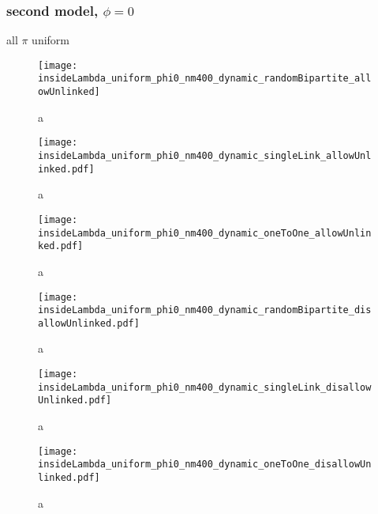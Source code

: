 \subsubsection{second model, $\phi=0$}

all $\pi$ uniform

\begin{figure}
  \centering
  \texttt{[image: insideLambda\_uniform\_phi0\_nm400\_dynamic\_randomBipartite\_allowUnlinked]}
  \caption{a}
  \label{fig:insideLambda_uniform_phi0_nm400_dynamic_randomBipartite_allowUnlinked}
\end{figure}

\begin{figure}
  \centering
  \texttt{[image: insideLambda\_uniform\_phi0\_nm400\_dynamic\_singleLink\_allowUnlinked.pdf]}
  \caption{a}
  \label{fig:insideLambda_uniform_phi0_nm400_dynamic_singleLink_allowUnlinked}
\end{figure}

\begin{figure}
  \centering
  \texttt{[image: insideLambda\_uniform\_phi0\_nm400\_dynamic\_oneToOne\_allowUnlinked.pdf]}
  \caption{a}
  \label{fig:insideLambda_uniform_phi0_nm400_dynamic_oneToOne_allowUnlinked}
\end{figure}

\begin{figure}
  \centering
  \texttt{[image: insideLambda\_uniform\_phi0\_nm400\_dynamic\_randomBipartite\_disallowUnlinked.pdf]}
  \caption{a}
  \label{fig:insideLambda_uniform_phi0_nm400_dynamic_randomBipartite_disallowUnlinked}
\end{figure}

\begin{figure}
  \centering
  \texttt{[image: insideLambda\_uniform\_phi0\_nm400\_dynamic\_singleLink\_disallowUnlinked.pdf]}
  \caption{a}
  \label{fig:insideLambda_uniform_phi0_nm400_dynamic_singleLink_disallowUnlinked}
\end{figure}

\begin{figure}
  \centering
  \texttt{[image: insideLambda\_uniform\_phi0\_nm400\_dynamic\_oneToOne\_disallowUnlinked.pdf]}
  \caption{a}
  \label{fig:insideLambda_uniform_phi0_nm400_dynamic_oneToOne_disallowUnlinked}
\end{figure}


